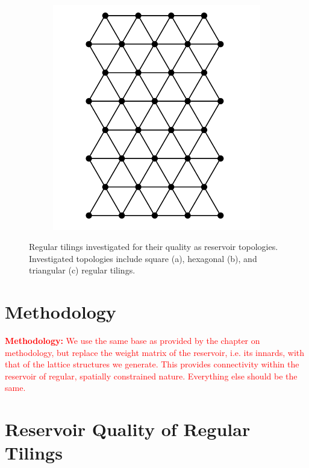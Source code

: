 \begin{figure}[t]
\begin{subfigure}{.32\textwidth}
    \label{fig:rt-hex}
  \end{subfigure}
  \begin{subfigure}{.32\textwidth}
    \centering
    \includegraphics[width=1.0\linewidth]{figures/triangular.png}
    \label{fig:rt-tri}
  \end{subfigure}
  \caption{
    Regular tilings investigated for their quality as reservoir
topologies. Investigated topologies include square (a), hexagonal (b), and
triangular (c) regular tilings.
  }
  \label{fig:regular-tilings}
\end{figure}

\section{Methodology}

\textcolor{red}{
  \textbf{Methodology:} We use the same base as provided by the chapter on
methodology, but replace the weight matrix of the reservoir, i.e. its innards,
with that of the lattice structures we generate. This provides connectivity
within the reservoir of regular, spatially constrained nature. Everything else
should be the same.
}

\section{Reservoir Quality of Regular Tilings}

